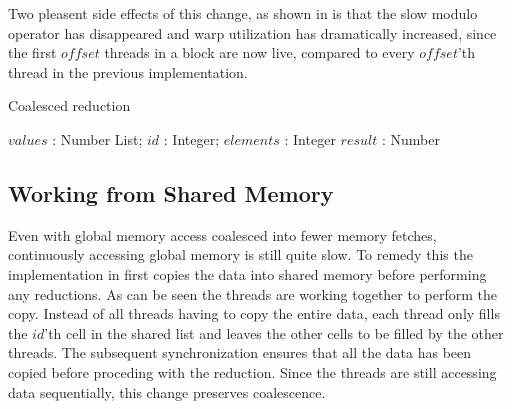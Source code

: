 
Two pleasent side effects of this change, as shown in
 is that the slow modulo operator has
disappeared and warp utilization has dramatically increased, since the
first $offset$ threads in a block are now live, compared to every
$offset$'th thread in the previous implementation.

\begin{algorithm}
  \caption{Coalesced reduction}
  \label{alg:coalescedReduct}
  \begin{algorithmic}
              {$values$ : Number List; $id$ : Integer; $elements$ : Integer}
              {$result$ : Number}
              {
                  \ENDIF
                  \SYNC
                \ENDWHILE
                \ENDIF
              }
  \end{algorithmic}
\end{algorithm}



\subsection{Working from Shared Memory}\label{sec:usingSharedMem}

Even with global memory access coalesced into fewer memory fetches,
continuously accessing global memory is still quite slow. To remedy
this the implementation in  first copies the
data into shared memory before performing any reductions. As can be
seen the threads are working together to perform the copy. Instead of
all threads having to copy the entire data, each thread only fills the
$id$'th cell in the shared list and leaves the other cells to be
filled by the other threads. The subsequent synchronization ensures
that all the data has been copied before proceding with the
reduction. Since the threads are still accessing data sequentially,
this change preserves coalescence.

